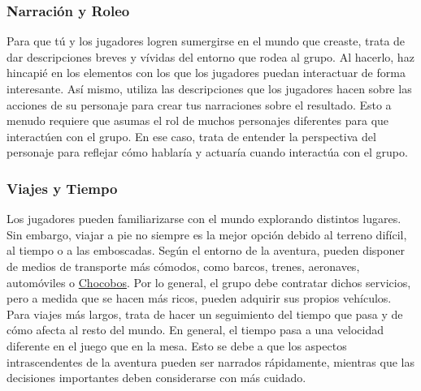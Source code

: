 \subsubsection*{Narración y Roleo}
Para que tú y los jugadores logren sumergirse en el mundo que creaste, trata de dar descripciones breves y vívidas del entorno que rodea al grupo. Al hacerlo, haz hincapié en los elementos con los que los jugadores puedan interactuar de forma interesante. Así mismo, utiliza las descripciones que los jugadores hacen sobre las acciones de su personaje para crear tus narraciones sobre el resultado. Esto a menudo requiere que asumas el rol de muchos personajes diferentes para que interactúen con el grupo. En ese caso, trata de entender la perspectiva del personaje para reflejar cómo hablaría y actuaría cuando interactúa con el grupo.

\vspace{1cm} 


\pagebreak

\subsubsection*{Viajes y Tiempo}
Los jugadores pueden familiarizarse con el mundo explorando distintos lugares. Sin embargo, viajar a pie no siempre es la mejor opción debido al terreno difícil, al tiempo o a las emboscadas. Según el entorno de la aventura, pueden disponer de medios de transporte más cómodos, como barcos, trenes, aeronaves, automóviles o \hyperlink{chocobo}{Chocobos}. Por lo general, el grupo debe contratar dichos servicios, pero a medida que se hacen más ricos, pueden adquirir sus propios vehículos. Para viajes más largos, trata de hacer un seguimiento del tiempo que pasa y de cómo afecta al resto del mundo. En general, el tiempo pasa a una velocidad diferente en el juego que en la mesa. Esto se debe a que los aspectos intrascendentes de la aventura pueden ser narrados rápidamente, mientras que las decisiones importantes deben considerarse con más cuidado.


